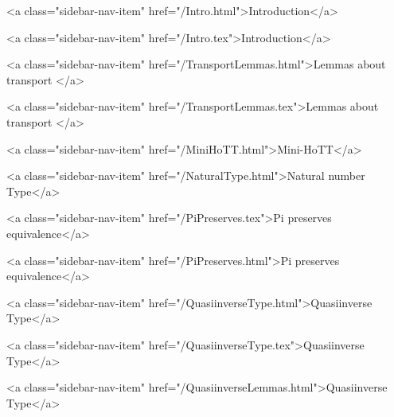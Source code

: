       
    
      
        
          <a class="sidebar-nav-item" href="/Intro.html">Introduction</a>
        
      
    
      
        
          <a class="sidebar-nav-item" href="/Intro.tex">Introduction</a>
        
      
    
      
        
          <a class="sidebar-nav-item" href="/TransportLemmas.html">Lemmas about transport </a>
        
      
    
      
        
          <a class="sidebar-nav-item" href="/TransportLemmas.tex">Lemmas about transport </a>
        
      
    
      
        
          <a class="sidebar-nav-item" href="/MiniHoTT.html">Mini-HoTT</a>
        
      
    
      
        
          <a class="sidebar-nav-item" href="/NaturalType.html">Natural number Type</a>
        
      
    
      
        
          <a class="sidebar-nav-item" href="/PiPreserves.tex">Pi preserves equivalence</a>
        
      
    
      
        
          <a class="sidebar-nav-item" href="/PiPreserves.html">Pi preserves equivalence</a>
        
      
    
      
        
          <a class="sidebar-nav-item" href="/QuasiinverseType.html">Quasiinverse Type</a>
        
      
    
      
        
          <a class="sidebar-nav-item" href="/QuasiinverseType.tex">Quasiinverse Type</a>
        
      
    
      
        
          <a class="sidebar-nav-item" href="/QuasiinverseLemmas.html">Quasiinverse Type</a>
        
